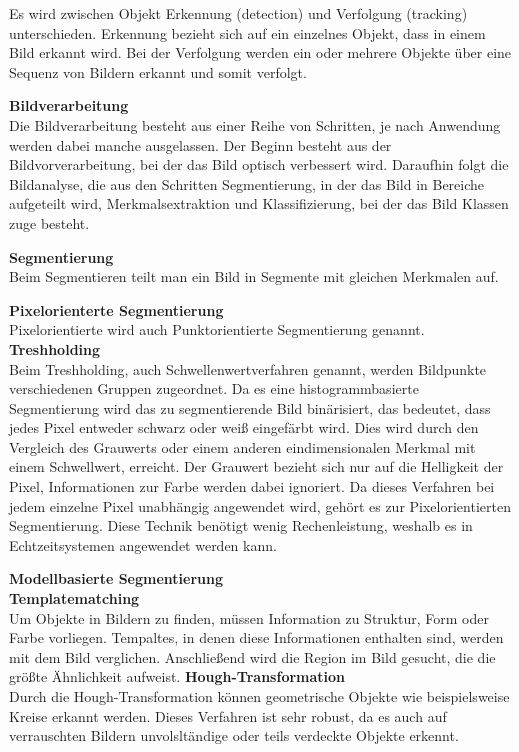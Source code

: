     Es wird zwischen Objekt Erkennung (detection) und Verfolgung (tracking) unterschieden. Erkennung bezieht sich auf ein einzelnes Objekt, dass in einem Bild erkannt wird. Bei der Verfolgung werden ein oder mehrere Objekte über eine Sequenz von Bildern erkannt und somit verfolgt.
    \cite{obj_det_trak}

    \textbf{Bildverarbeitung}\\ 
    Die Bildverarbeitung besteht aus einer Reihe von Schritten, je nach Anwendung werden dabei manche ausgelassen.
    Der Beginn besteht aus der Bildvorverarbeitung, bei der das Bild optisch verbessert wird. Daraufhin folgt die Bildanalyse, die aus den Schritten Segmentierung, in der das Bild in Bereiche aufgeteilt wird, Merkmalsextraktion und Klassifizierung, bei der das Bild Klassen zuge besteht. \cite{Bildverarbeitung} \cite{Bildverarbeitung2}

    \textbf{Segmentierung}\\
    Beim Segmentieren teilt man ein Bild in Segmente mit gleichen Merkmalen auf.

    \textbf{Pixelorienterte Segmentierung}\\ 
    Pixelorientierte wird auch Punktorientierte Segmentierung genannt. \cite{Seg_punkt}
    \textbf{Treshholding}\\ 
    Beim Treshholding, auch Schwellenwertverfahren genannt, werden Bildpunkte verschiedenen Gruppen zugeordnet. Da es eine histogrammbasierte Segmentierung wird das zu segmentierende Bild binärisiert, das bedeutet, dass jedes Pixel entweder schwarz oder weiß eingefärbt wird. Dies wird durch den Vergleich des Grauwerts oder einem anderen eindimensionalen Merkmal mit einem Schwellwert, erreicht. Der Grauwert bezieht sich nur auf die Helligkeit der Pixel, Informationen zur Farbe werden dabei ignoriert. Da dieses Verfahren bei jedem einzelne Pixel unabhängig angewendet wird, gehört es zur Pixelorientierten Segmentierung. Diese Technik benötigt wenig Rechenleistung, weshalb es in Echtzeitsystemen angewendet werden kann.

    \textbf{Modellbasierte Segmentierung}\\ \cite{Seg_modell}
    \textbf{Templatematching}\\
    Um Objekte in Bildern zu finden, müssen Information zu Struktur, Form oder Farbe vorliegen. Tempaltes, in denen diese Informationen enthalten sind, werden mit dem Bild verglichen. Anschließend wird die Region im Bild gesucht, die die größte Ähnlichkeit aufweist.
    \textbf{Hough-Transformation}\\
    Durch die Hough-Transformation können geometrische Objekte wie beispielsweise Kreise erkannt werden. Dieses Verfahren ist sehr robust, da es auch auf verrauschten Bildern unvolsltändige oder teils verdeckte Objekte erkennt.

